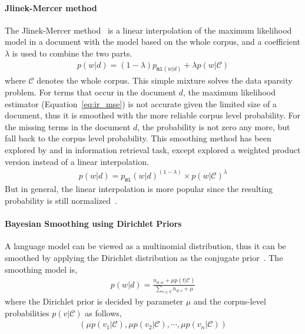 \paragraph{Jlinek-Mercer method}

The Jlinek-Mercer method~\cite{Jelinek-1980} is a linear interpolation of the maximum likelihood model in a document with the model based on the whole corpus, and a coefficient $\lambda$ is used to combine the two parts. 
\begin{align}
p(w|d) = (1 - \lambda) p_{\texttt{ml}(w|d)} + \lambda p(w|\mathcal{C})
\end{align}
where $\mathcal{C}$ denotes the whole corpus. This simple mixture solves the data sparsity problem. For terms that occur in the document $d$, the maximum likelihood estimator (Equation~\ref{eq:ir_mse}) is not accurate given the limited size of a document, thus it is smoothed with the more reliable corpus level probability. For the missing terms in the document $d$, the probability is not zero any more, but fall back to the corpus level probability. This smoothing method has been explored by \cite{PonteCroft} and \cite{song-99} in information retrieval task, except \cite{PonteCroft} explored a weighted product version instead of a linear interpolation. 
\begin{align}
p(w|d) = p_{\texttt{ml}}(w|d)^{(1 - \lambda) } \times p(w|\mathcal{C})^{\lambda}
\label{eq:lm-jr}
\end{align}
But in general, the linear interpolation is more popular since the resulting probability is still normalized~\citep{song-99}.

\paragraph{Bayesian Smoothing using Dirichlet Priors}

A language model can be viewed as a multinomial distribution, thus it can be smoothed by applying the Dirichlet distribution as the conjugate prior~\citep{mackay95dirichlet}. The smoothing model is,
\begin{align}
p(w|d) = \frac{n_{d,w} + \mu p(t|\mathcal{C})}{\sum_{v \in V} n_{d,v} + \mu}
\end{align}
where the Dirichlet prior is decided by parameter $\mu$ and the corpus-level probabilities $p(v|\mathcal{C})$ as follows,
\begin{align}
(\mu p(v_1 | \mathcal{C}), \mu p(v_2 | \mathcal{C}), \cdots, \mu p(v_n | \mathcal{C}))
\label{eq:lm-bs}
\end{align}


